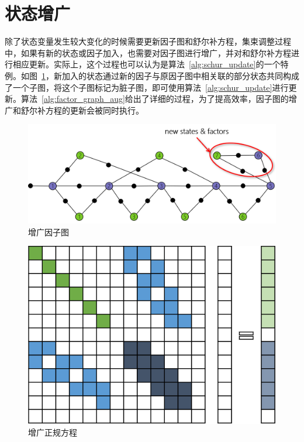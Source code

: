 \section{状态增广}

除了状态变量发生较大变化的时候需要更新因子图和舒尔补方程，集束调整过程中，如果有新的状态或因子加入，也需要对因子图进行增广，并对和舒尔补方程进行相应更新。实际上，这个过程也可以认为是算法~\ref{alg:schur_update}的一个特例。如图~\ref{fig:factor_graph_aug}，新加入的状态通过新的因子与原因子图中相关联的部分状态共同构成了一个子图，将这个子图标记为脏子图，即可使用算法~\ref{alg:schur_update}进行更新。算法~\ref{alg:factor_graph_aug}给出了详细的过程，为了提高效率，因子图的增广和舒尔补方程的更新会被同时执行。

\begin{figure}[htb!]
    \centering
    \includegraphics[scale=.7]{Pictures/factor_graph_aug.png}
    \caption{增广因子图}
    \label{fig:factor_graph_aug}
\end{figure}

\begin{figure}[htb!]
    \centering
    \includegraphics[scale=1]{Pictures/normal_eq_aug.png}
    \caption{增广正规方程}
    \label{fig:normal_eq_aug}
\end{figure}

